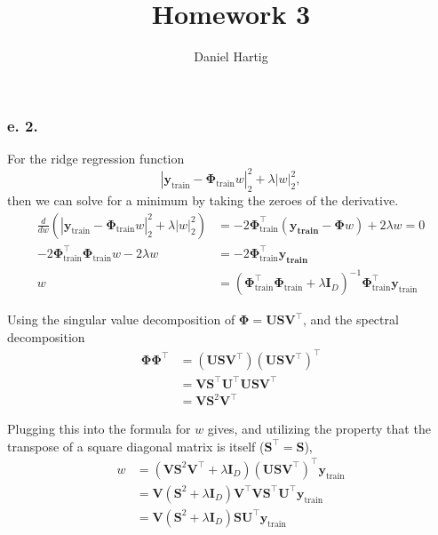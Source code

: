 \documentclass{article}
\title{Homework 3}
\author{Daniel Hartig}
\begin{document}
\maketitle

\subsubsection*{e. 2.}
For the ridge regression function $$\left|\mathbf{y}_{\text{train}}-\mathbf{\Phi}_{\text{train}}w\right|^2_2 + \lambda\left|w\right|^2_2,$$ then we can solve for a minimum by taking the zeroes of the derivative. 
\begin{align*}
\frac{d}{dw}\left(\left|\mathbf{y}_{\text{train}}-\mathbf{\Phi}_{\text{train}}w\right|^2_2 + \lambda\left|w\right|^2_2\right) &= -2\mathbf{\Phi}_{\text{train}}^\intercal\left(\mathbf{y_{\text{train}}} - \mathbf{\Phi}w\right)+2\lambda w = 0 \\
-2\mathbf{\Phi}_{\text{train}}^\intercal\mathbf{\Phi}_{\text{train}}w - 2\lambda w &= -2\mathbf{\Phi}_{\text{train}}^\intercal\mathbf{y_{\text{train}}} \\
w &= \left(\mathbf{\Phi}_{\text{train}}^\intercal\mathbf{\Phi}_{\text{train}} + \lambda \mathbf{I}_{D}\right)^{-1}\mathbf{\Phi}_{\text{train}}^\intercal\mathbf{y}_{\text{train}}
 \end{align*}
 
Using the singular value decomposition of $\mathbf{\Phi} = \mathbf{U}\mathbf{S}\mathbf{V}^\intercal$, and the spectral decomposition
\begin{align*}
\mathbf{\Phi}\mathbf{\Phi}^\intercal &= \left(\mathbf{U}\mathbf{S}\mathbf{V}^\intercal\right)\left(\mathbf{U}\mathbf{S}\mathbf{V}^\intercal\right)^\intercal \\
&=\mathbf{V}\mathbf{S}^\intercal\mathbf{U}^\intercal\mathbf{U}\mathbf{S}\mathbf{V}^\intercal \\
&=\mathbf{V}\mathbf{S}^2\mathbf{V}^\intercal
\end{align*}

Plugging this into the formula for $w$ gives, and utilizing the property that the transpose of a square diagonal matrix is itself ($\mathbf{S}^\intercal = \mathbf{S}$),
\begin{align*}
w &= \left(\mathbf{V}\mathbf{S}^2\mathbf{V}^\intercal + \lambda\mathbf{I}_D\right)\left(\mathbf{U}\mathbf{S}\mathbf{V}^\intercal\right)^\intercal\mathbf{y}_{\text{train}} \\
&=\mathbf{V}\left(\mathbf{S}^2+ \lambda\mathbf{I}_D\right)\mathbf{V}^\intercal\mathbf{V}\mathbf{S}^\intercal\mathbf{U}^\intercal\mathbf{y}_{\text{train}} \\
& = \mathbf{V}\left(\mathbf{S}^2+ \lambda\mathbf{I}_D\right)\mathbf{S}\mathbf{U}^\intercal\mathbf{y}_{\text{train}}
\end{align*}
\end{document}
